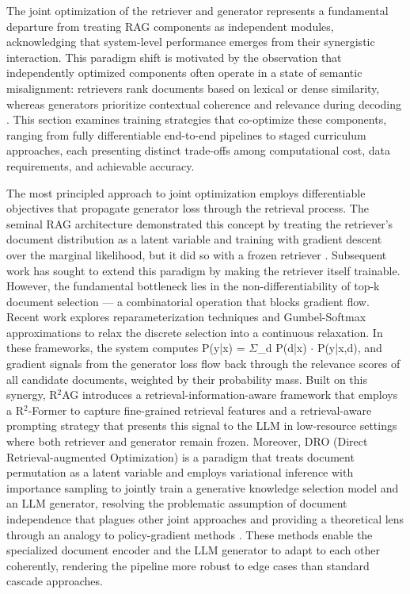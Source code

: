 \documentclass[11pt,a4paper]{article}
\begin{document}
The joint optimization of the retriever and generator represents a fundamental departure from treating RAG components as independent modules, acknowledging that system-level performance emerges from their synergistic interaction. This paradigm shift is motivated by the observation that independently optimized components often operate in a state of semantic misalignment: retrievers rank documents based on lexical or dense similarity, whereas generators prioritize contextual coherence and relevance during decoding \cite{arxiv:2406.13249v1}. This section examines training strategies that co-optimize these components, ranging from fully differentiable end-to-end pipelines to staged curriculum approaches, each presenting distinct trade-offs among computational cost, data requirements, and achievable accuracy.

The most principled approach to joint optimization employs differentiable objectives that propagate generator loss through the retrieval process. The seminal RAG architecture demonstrated this concept by treating the retriever's document distribution as a latent variable and training with gradient descent over the marginal likelihood, but it did so with a frozen retriever \cite{arxiv:2005.11401v4}. Subsequent work has sought to extend this paradigm by making the retriever itself trainable. However, the fundamental bottleneck lies in the non-differentiability of top-k document selection --- a combinatorial operation that blocks gradient flow. Recent work explores reparameterization techniques and Gumbel-Softmax approximations to relax the discrete selection into a continuous relaxation. In these frameworks, the system computes P(y|x) = $\Sigma$\_d P(d|x) $\cdot$ P(y|x,d), and gradient signals from the generator loss flow back through the relevance scores of all candidate documents, weighted by their probability mass. Built on this synergy, R$^{2}$AG \cite{arxiv:2406.13249v1} introduces a retrieval-information-aware framework that employs a R$^{2}$-Former to capture fine-grained retrieval features and a retrieval-aware prompting strategy that presents this signal to the LLM in low-resource settings where both retriever and generator remain frozen. Moreover, DRO (Direct Retrieval-augmented Optimization) is a paradigm that treats document permutation as a latent variable and employs variational inference with importance sampling to jointly train a generative knowledge selection model and an LLM generator, resolving the problematic assumption of document independence that plagues other joint approaches and providing a theoretical lens through an analogy to policy-gradient methods \cite{arxiv:2505.03075v1}. These methods enable the specialized document encoder and the LLM generator to adapt to each other coherently, rendering the pipeline more robust to edge cases than standard cascade approaches.
\end{document}
